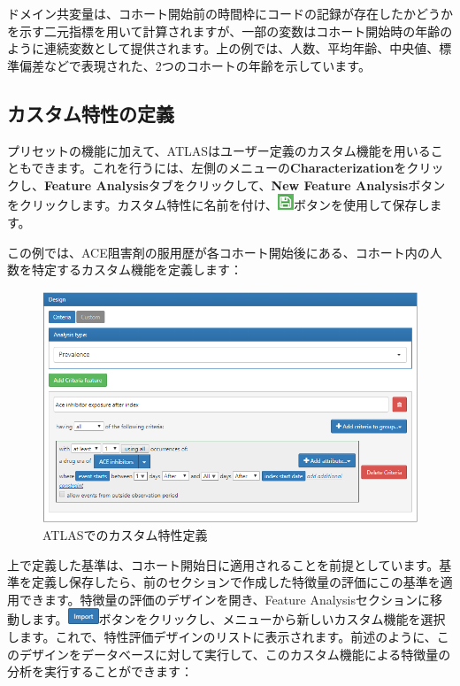 \documentclass[
  11pt]{book}
\theoremstyle{definition}
\theoremstyle{definition}
\theoremstyle{definition}
\theoremstyle{definition}
\theoremstyle{remark}
\begin{document}
ドメイン共変量は、コホート開始前の時間枠にコードの記録が存在したかどうかを示す二元指標を用いて計算されますが、一部の変数はコホート開始時の年齢のように連続変数として提供されます。上の例では、人数、平均年齢、中央値、標準偏差などで表現された、2つのコホートの年齢を示しています。

\subsection{カスタム特性の定義}\label{ux30abux30b9ux30bfux30e0ux7279ux6027ux306eux5b9aux7fa9}

プリセットの機能に加えて、ATLASはユーザー定義のカスタム機能を用いることもできます。これを行うには、左側のメニューの\textbf{Characterization}をクリックし、\textbf{Feature Analysis}タブをクリックして、\textbf{New Feature Analysis}ボタンをクリックします。カスタム特性に名前を付け、\includegraphics{images/PopulationLevelEstimation/save.png}ボタンを使用して保存します。

この例では、ACE阻害剤の服用歴が各コホート開始後にある、コホート内の人数を特定するカスタム機能を定義します：

\begin{figure}

{\centering \includegraphics[width=1\linewidth]{images/Characterization/atlasCharacterizationCustomFeature} 

}

\caption{ATLASでのカスタム特性定義}\label{fig:atlasCharacterizationCustomFeature}
\end{figure}

上で定義した基準は、コホート開始日に適用されることを前提としています。基準を定義し保存したら、前のセクションで作成した特徴量の評価にこの基準を適用できます。特徴量の評価のデザインを開き、Feature Analysisセクションに移動します。\includegraphics{images/Characterization/atlasImportButton.png}ボタンをクリックし、メニューから新しいカスタム機能を選択します。これで、特性評価デザインのリストに表示されます。前述のように、このデザインをデータベースに対して実行して、このカスタム機能による特徴量の分析を実行することができます：
\end{document}
